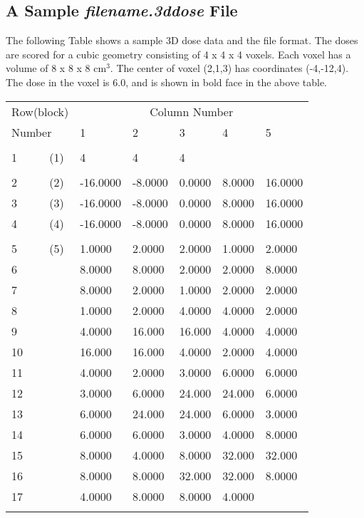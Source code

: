 \documentclass[12pt,twoside]{article}
\begin{document}
\subsection{A Sample {\em filename.3ddose} File}
The following Table shows a sample 3D dose data and the file format. The doses are scored for a cubic geometry consisting of  4 x 4 x 4 voxels. Each voxel has a volume of  8 x 8 x 8 cm$^3$.
The center of voxel (2,1,3) has coordinates (-4,-12,4). The dose in the voxel is 6.0, and is shown in bold face in the above table.
\newline\\
{\scriptsize
\begin{tabular}[t]{||p{1.5cm}|p{2cm}|p{2cm}|p{2cm}|p{2cm}|p{2cm}||} \hline\hline
Row(block) & \multicolumn{5}{c||}{Column Number} \\ \cline{2-6}

Number &  1 &        2 &         3       & 4      &  5 \\ \hline
& & & & & \\

1 ~~~~~(1) &    4       &      4       &    4  &  & \\
& & & & & \\

2 ~~~~~(2)&   -16.0000 &    -8.0000 &    0.0000 &    8.0000 &   16.0000 \\
3 ~~~~~(3)&   -16.0000 &    -8.0000 &    0.0000 &    8.0000 &   16.0000  \\
4 ~~~~~(4)&   -16.0000 &    -8.0000 &    0.0000 &    8.0000 &   16.0000 \\
& & & & & \\

5 ~~~~~(5) &     1.0000 &    2.0000 &    2.0000 &    1.0000 &    2.0000\\
6 &     8.0000 &    8.0000 &    2.0000  &   2.0000 &    8.0000\\
7 &     8.0000 &    2.0000 &    1.0000 &    2.0000 &    2.0000\\
8 &     1.0000 &    2.0000 &    4.0000 &    4.0000 &    2.0000\\
9 &     4.0000 &    16.000 &    16.000 &    4.0000 &    4.0000 \\
10 &    16.000 &    16.000 &    4.0000 &    2.0000 &    4.0000 \\
11 &    4.0000 &    2.0000 &    3.0000 &    6.0000  &   6.0000\\
12 &    3.0000 &    6.0000 &    24.000 &    24.000 &    6.0000  \\
13 &    6.0000 &    24.000 &    24.000 &    6.0000 &    3.0000   \\
14 &    6.0000 &    6.0000 &    3.0000 &    4.0000 &    8.0000 \\
15 &    8.0000 &    4.0000  &   8.0000 &    32.000 &    32.000\\
16 &    8.0000 &    8.0000 &    32.000 &    32.000 &    8.0000 \\
17 &    4.0000 &    8.0000 &    8.0000 &    4.0000 &  \\
& & & & & \\


\end{tabular}}
\end{document}
